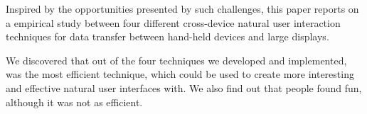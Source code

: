 Inspired by the opportunities presented by such challenges, this paper reports on a empirical study between four different cross-device natural user interaction techniques for data transfer between hand-held devices and large displays.

We discovered that out of the four techniques we developed and implemented, \swipe was the most efficient technique, which could be used to create more interesting and effective natural user interfaces with. 
We also find out that people found \pinch fun, although it was not as efficient. 

